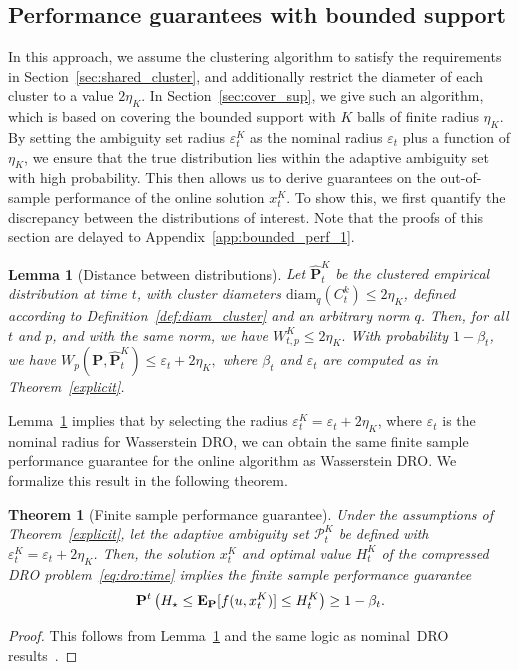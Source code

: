 \documentclass[12pt]{article}
\newcommand{\prob}{{\mathbf P}}
\newcommand{\Expect}{{\mbox{\bf E}}}
\newcommand{\eps}{\varepsilon^K}
\newcommand{\epsnom}{\varepsilon}
\newcommand{\ld}{W}
\newtheorem{theorem}{Theorem}[section]  %
\newtheorem{lemma}{Lemma}[section]  %
\begin{document}
\subsection{Performance guarantees with bounded support}
\label{sec:bounded_cover_performance}
In this approach, we assume the clustering algorithm to satisfy the requirements in Section~\ref{sec:shared_cluster}, and additionally restrict the diameter of each cluster to a value $2\eta_K$. In Section~\ref{sec:cover_sup}, we give such an algorithm, which is based on covering the bounded support with $K$ balls of finite radius $\eta_K$.
By setting the ambiguity set radius $\eps_t$ as the nominal radius $\epsnom_t$ plus a function of $\eta_K$, we ensure that the true distribution lies within the adaptive ambiguity set with high probability. This then allows us to derive guarantees on the out-of-sample performance of the online solution $x^K_{t}$.
To show this, we first quantify the discrepancy between the distributions of interest. Note that the proofs of this section are delayed to Appendix~\ref{app:bounded_perf_1}. 
\begin{lemma}[Distance between distributions] 
\label{lem:dist} 
Let $\hat{\prob}^K_t$ be the clustered empirical distribution at time $t$, with cluster diameters $\mathrm{diam}_q(C^k_t) \leq 2\eta_K$, defined according to Definition~\ref{def:diam_cluster} and an arbitrary norm $q$. Then, for all $t$ and $p$, and with the same norm, we have 
$\ld^K_{t,p} \leq 2\eta_K.$ With probability $1-
\beta_t$, we have
$ W_p(\mathbf{P}, \hat{\mathbf{P}}^K_t)  \leq \epsnom_t + 2\eta_K,$ where $\beta_t$ and $\epsnom_t$ are computed as in Theorem~\ref{explicit}.
\end{lemma}
Lemma~\ref{lem:dist} implies that by selecting the radius $\eps_t = \epsnom_t + 2\eta_K$, where $\epsnom_t$ is the nominal radius for Wasserstein \gls{DRO}, we can obtain the same finite sample performance guarantee for the online algorithm as Wasserstein \gls{DRO}. 
We formalize this result in the following theorem. 
\begin{theorem}[Finite sample performance guarantee]\label{lemma:guarantees_fin}
Under the assumptions of Theorem~\ref{explicit}, let the adaptive ambiguity set $\mathcal{P}^K_{t}$ be defined with $\eps_{t} = \epsnom_{t} + 2\eta_K$. Then, the solution $x^K_{t}$ and optimal value $H^K_t$ of the compressed \gls{DRO} problem~\eqref{eq:dro:time} implies the finite sample performance guarantee
\begin{equation*}
	\prob^{t}\left( H_\star \leq \Expect_{\prob}[f(u, x^K_{t})] \le H^K_t\right) \ge 1 - \beta_{t}.
\end{equation*}
\end{theorem}
\begin{proof}
    This follows from Lemma~\ref{lem:dist} and the same logic as nominal~\gls{DRO} results~\cite[Theorem 3.5]{mohajerin2018data}.
\end{proof}
\end{document}
